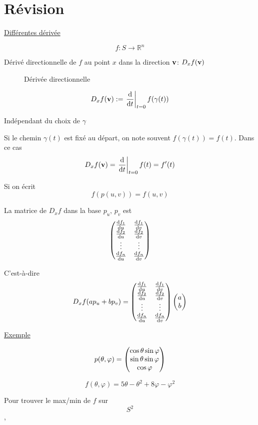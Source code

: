 


\section*{Révision}

\underline{Différentes dérivée} 

$$f: S \to \mathbb{R}^n$$ 

Dérivé directionnelle de $f$ au point $x$ dans la direction $\vb{v}$: $D_x f(\vb{v})$    

\begin{figure}[ht]
    \centering
    \caption{Dérivée directionnelle}
    \label{fig:dérivée-directionnelle}
\end{figure}

$$D_x f(\vb{v}) := \eval{\dv{{}}{t}}_{t=0} f(\gamma(t)) $$ 

Indépendant du choix de $\gamma$ 

\begin{tcolorbox}[title=Raccourcit de notation, colframe=orange]
Si le chemin $\gamma(t)$ est fixé au départ, on note souvent $f(\gamma(t)) = f(t)$. Dans ce cas $$D_x f(\vb{v}) = \eval{\dv{{}}{t} }_{t=0} f(t) = f'(t) $$   
\end{tcolorbox}

Si on écrit $$f(p(u,v)) = f(u,v)$$ 

La matrice de $D_x f$ dans la base $p_u ,\, p_v $ est $$\begin{pmatrix} \dv{f_1}{u} & \dv{f_1}{v} \\ \dv{f_2}{u} & \dv{f_2}{v} \\\vdots & \vdots\\ \dv{f_n}{u} & \dv{f_n}{v}  \end{pmatrix}$$  

C'est-à-dire $$D_x f(a p_u + b p_v ) =  \begin{pmatrix} \dv{f_1}{u} & \dv{f_1}{v} \\ \dv{f_2}{u} & \dv{f_2}{v} \\\vdots & \vdots\\ \dv{f_n}{u} & \dv{f_n}{v}  \end{pmatrix} \begin{pmatrix} a \\b \end{pmatrix}$$ 

\underline{Exemple} 

$$p(\theta, \varphi) = \begin{pmatrix} \cos\theta\sin\varphi\\ \sin\theta\sin\varphi\\\cos\varphi \end{pmatrix}$$ 

$$f(\theta, \varphi) = 5\theta -\theta^2 + 8\varphi -\varphi^2$$ 

Pour trouver le max/min de $f$ sur $$S^2$$,

